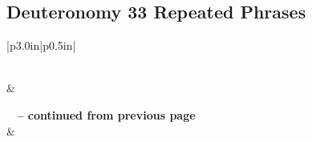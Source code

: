 \subsection{Deuteronomy 33 Repeated Phrases}


\normalsize
 
\begin{center}
\begin{longtable}{|p{3.0in}|p{0.5in}|}
\caption[Deuteronomy 33 Repeated Phrases]{Deuteronomy 33 Repeated Phrases}\label{table:Repeated Phrases Deuteronomy 33} \\
\hline {} &  \\ \hline 
\endfirsthead
 
{{\bfseries \tablename\ \thetable{} -- continued from previous page}} \\  
\hline {} &  \\ \hline 
\endhead
 

\end{longtable}
\end{center}
